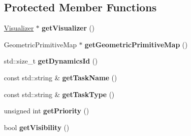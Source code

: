 \subsection*{Protected Member Functions}
\begin{DoxyCompactItemize}
\item 
\hypertarget{classhiqp_1_1TaskFunction_ac6aec46978ac4162f69264d79e1c1ab8}{\hyperlink{classhiqp_1_1Visualizer}{Visualizer} $\ast$ {\bfseries get\-Visualizer} ()}\label{classhiqp_1_1TaskFunction_ac6aec46978ac4162f69264d79e1c1ab8}

\item 
\hypertarget{classhiqp_1_1TaskFunction_ab229de62c0f0c2b4620fd364d90c344f}{Geometric\-Primitive\-Map $\ast$ {\bfseries get\-Geometric\-Primitive\-Map} ()}\label{classhiqp_1_1TaskFunction_ab229de62c0f0c2b4620fd364d90c344f}

\item 
\hypertarget{classhiqp_1_1TaskFunction_a2af5e1230868e1949620c3e8bcf4de71}{std\-::size\-\_\-t {\bfseries get\-Dynamics\-Id} ()}\label{classhiqp_1_1TaskFunction_a2af5e1230868e1949620c3e8bcf4de71}

\item 
\hypertarget{classhiqp_1_1TaskFunction_a90ebccdc0bec19ec6379f2aaba2e3772}{const std\-::string \& {\bfseries get\-Task\-Name} ()}\label{classhiqp_1_1TaskFunction_a90ebccdc0bec19ec6379f2aaba2e3772}

\item 
\hypertarget{classhiqp_1_1TaskFunction_af5b3c489bb216aefb6e25db60a55eb0c}{const std\-::string \& {\bfseries get\-Task\-Type} ()}\label{classhiqp_1_1TaskFunction_af5b3c489bb216aefb6e25db60a55eb0c}

\item 
\hypertarget{classhiqp_1_1TaskFunction_a13f5da940c9bc2f7c669659b2b0a3cd4}{unsigned int {\bfseries get\-Priority} ()}\label{classhiqp_1_1TaskFunction_a13f5da940c9bc2f7c669659b2b0a3cd4}

\item 
\hypertarget{classhiqp_1_1TaskFunction_aa30289e417f880bbe41c0a0e2e3af362}{bool {\bfseries get\-Visibility} ()}\label{classhiqp_1_1TaskFunction_aa30289e417f880bbe41c0a0e2e3af362}

\end{DoxyCompactItemize}
